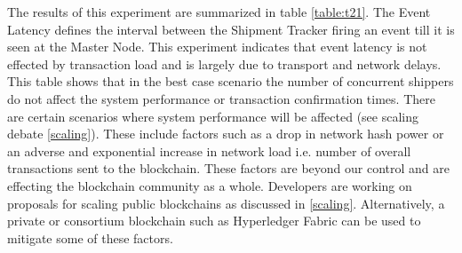 The results of this experiment are summarized in table \ref{table:t21}. The Event Latency defines the interval between the Shipment Tracker firing an event till it is seen at the Master Node. This experiment indicates that event latency is not effected by transaction load and is largely due to transport and network delays. This table shows that in the best case scenario the number of concurrent shippers do not affect the system performance or transaction confirmation times. There are certain scenarios where system performance will be affected (see scaling debate \ref{scaling}). These include factors such as a drop in network hash power or an adverse and exponential increase in network load i.e. number of overall transactions sent to the blockchain. These factors are beyond our control and are effecting the blockchain community as a whole. Developers are working on proposals for scaling public blockchains as discussed in \ref{scaling}. Alternatively, a private or consortium blockchain such as Hyperledger Fabric can be used to mitigate some of these factors.     
\vspace{1mm}
\begin{table}[h]
\centering
{}
\caption {Performance Impact of Multiple Concurrent Shippers on Decentralized Shipment Tracker}
\label{table:t21}
\end{table}




